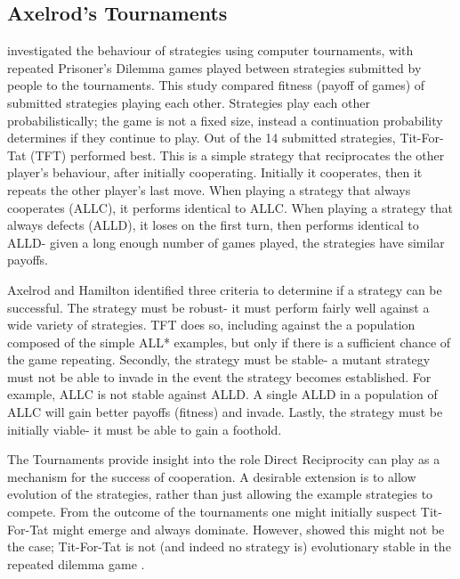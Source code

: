 \documentclass[a4paper,11pt]{article}
\begin{document}
\subsection{Axelrod's Tournaments}
\citet{axelrod:Science:1981} investigated the behaviour of strategies using computer tournaments, with repeated Prisoner's Dilemma games played between strategies submitted by people to the tournaments. 
This study compared fitness (payoff of games) of submitted strategies playing each other. 
Strategies play each other probabilistically; the game is not a fixed size, instead a continuation probability determines if they continue to play. Out of the 14 submitted strategies, Tit-For-Tat (TFT) performed best. 
This is a simple strategy that reciprocates the other player's behaviour, after initially cooperating. 
Initially it cooperates, then it repeats the other player's last move. 
When playing a strategy that always cooperates (ALLC), it performs identical to ALLC. 
When playing a strategy that always defects (ALLD), it loses on the first turn, then performs identical to ALLD- given a long enough number of games played, the strategies have similar payoffs. 

Axelrod and Hamilton identified three criteria to determine if a strategy can be successful. The strategy must be robust- it must perform fairly well against a wide variety of strategies. TFT does so, including against the a population composed of the simple ALL* examples, but only if there is a sufficient chance of the game repeating. Secondly, the strategy must be stable- a mutant strategy must not be able to invade in the event the strategy becomes established. For example, ALLC is not stable against ALLD. 
A single ALLD in a population of ALLC will gain better payoffs (fitness) and invade. 
Lastly, the strategy must be initially viable- it must be able to gain a foothold. 

The Tournaments provide insight into the role Direct Reciprocity can play as a mechanism for the success of cooperation. 
A desirable extension is to allow evolution of the strategies, rather than just allowing the example strategies to compete. 
From the outcome of the tournaments one might initially suspect Tit-For-Tat might emerge and always dominate. However, \citet{boyd1987no} showed this might not be the case; Tit-For-Tat is not (and indeed no strategy is) evolutionary stable in the repeated dilemma game \citep{boyd1987no, van2010and}. 
\end{document}
